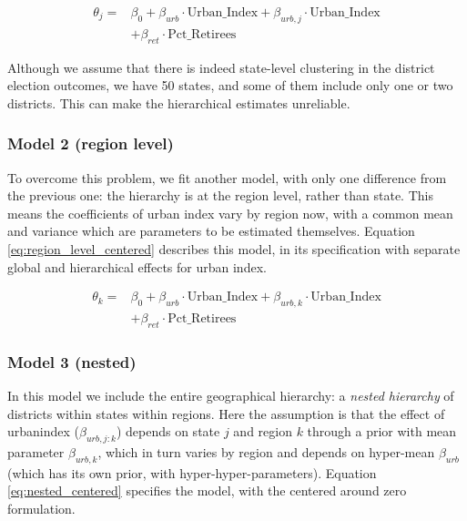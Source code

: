\documentclass[12pt]{article}
\begin{document}
\begin{equation} \label{eq:state_level_centered}
	\begin{aligned}
		\theta_{j} =    &\beta_0 + \beta_{urb} \cdot \text{Urban\_Index} + \beta_{urb,j} \cdot \text{Urban\_Index} \\
		&+ \beta_{ret} \cdot \text{Pct\_Retirees}
	\end{aligned}
\end{equation}


Although we assume that there is indeed state-level clustering in the district election outcomes, we have 50 states, and some of them include only one or two districts. This can make the hierarchical estimates unreliable. 


\subsubsection*{Model 2 (region level)}


To overcome this problem, we fit another model, with only one difference from the previous one: the hierarchy is at the region level, rather than state. This means the coefficients of urban index vary by region now, with a common mean and variance which are parameters to be estimated themselves.
Equation \ref{eq:region_level_centered} describes this model, in its specification with separate global and hierarchical effects for urban index.


\begin{equation} \label{eq:region_level_centered}
	\begin{aligned}
		\theta_{k} =    &\beta_0 + \beta_{urb} \cdot \text{Urban\_Index} + \beta_{urb,k} \cdot \text{Urban\_Index} \\
		&+ \beta_{ret} \cdot \text{Pct\_Retirees}
	\end{aligned}
\end{equation}


\subsubsection*{Model 3 (nested)}


In this model we include the entire geographical hierarchy: a \textit{nested hierarchy} of districts within states within regions.
Here the assumption is that the effect of urbanindex ($\beta_{urb, j:k}$) depends on state $j$ and region $k$ through a prior with mean parameter $\beta_{urb, k}$, which in turn varies by region and depends on hyper-mean $\beta_{urb}$ (which has its own prior, with hyper-hyper-parameters). Equation \ref{eq:nested_centered} specifies the model, with the centered around zero formulation. 
\end{document}
